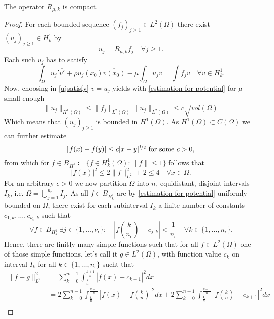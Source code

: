 \begin{theorem} \label{3.1:thm-Rmuk.isCompact}
	The operator $R_{\mu, k}$ is compact.

	\begin{proof}
	For each bounded sequence $(f_{j})_{j \geq 1} \in L^{2}(\Omega)$ there exist $(u_{j})_{j \geq 1} \in H^{1}_{k}$ by
		\[ u_{j} = R_{\mu, k} f_{j} \quad \forall j \geq 1. \]
	Each such $u_{j}$ has to satisfy
		\begin{equation}
			\int_{\Omega} u_{j}' \overline{v'} + \rho u_{j}(x_{0}) \overline{v(x_{0})} - \mu \int_{\Omega} u_{j} \overline{v} = \int f_{j} \overline{v} \quad \forall v \in H^{1}_{k}. \label{ujsatisfy}
		\end{equation} 
	Now, choosing in \eqref{ujsatisfy} $v = u_{j}$ yields with \eqref{estimation-for-potential} for $\mu$ small enough
		\[  \| u_{j} \|_{H^{1}(\Omega)} \leq \| f_{j} \|_{L^{2}(\Omega)} \| u_{j} \|_{L^{2}(\Omega)} \leq c \sqrt{vol(\Omega)} \]
	Which means that $(u_{j})_{j \geq 1}$ is bounded in $H^{1}(\Omega)$. As $H^1(\Omega) \subset C(\Omega)$ we can further estimate
		\begin{equation}
			|f(x) - f(y)| \leq c |x - y|^{\nicefrac{1}{2}} \text{ for some } c > 0, \label{eq:H1estimation}
		\end{equation}  
	from which for $f \in B_{H^{1}} \coloneqq \{ f \in H^{1}_{k}(\Omega) : \| f \| \leq 1 \}$ follows that 
		\[ |f(x)|^{2} \leq 2 \| f \|^{2}_{L^{2}} + 2 \leq 4 \quad \forall x \in \Omega. \]
	For an arbitrary $\epsilon > 0$ we now partition $\Omega$ into $n_{\epsilon}$ equidistant, disjoint intervals $I_{k}$, i.e. $\Omega = \bigcup_{j = 1}^{n_{\epsilon}} I_{j}$. As all $f \in B_{H^{1}_{k}}$ are by \eqref{estimation-for-potential} uniformly bounded on $\Omega$, there exist for each subinterval $I_{k}$ a finite number of constants $c_{1, k}, \dotsc, c_{\nu_{\epsilon}, k}$ such that 
			$$ \forall f \in B_{H^{1}_{k}} ~\exists j \in \{1, \dotsc, \nu_{\epsilon} \}: \quad |f(\frac{k}{n_{\epsilon}}) - c_{j, k}| < \frac{1}{n_{\epsilon}} \quad \forall k \in \{ 1 , \dotsc, n_{\epsilon} \}. $$	
	Hence, there are finitly many simple functions such that for all $f \in L^{2}(\Omega)$ one of those simple functions, let's call it $g \in L^{2}(\Omega)$, with function value $c_{k}$ on interval $I_{k}$ for all $k \in \{ 1, \dotsc, n_{\epsilon} \}$ sucht that
		\begin{align*}
			\| f - g \|^{2}_{L^{2}} & = \sum_{k = 0}^{n-1} \int_{\frac{k}{n}}^{\frac{k+1}{n}} | f(x) - c_{k+1} |^{2} dx \\
				& =  2 \sum_{k = 0}^{n-1} \int_{\frac{k}{n}}^{\frac{k+1}{n}} | f(x) - f(\frac{k}{n}) |^{2} dx +  2 \sum_{k = 0}^{n-1} \int_{\frac{k}{n}}^{\frac{k+1}{n}} | f(\frac{k}{n}) - c_{k+1} |^{2} dx \\

\end{align*}
\end{proof}
\end{theorem}
